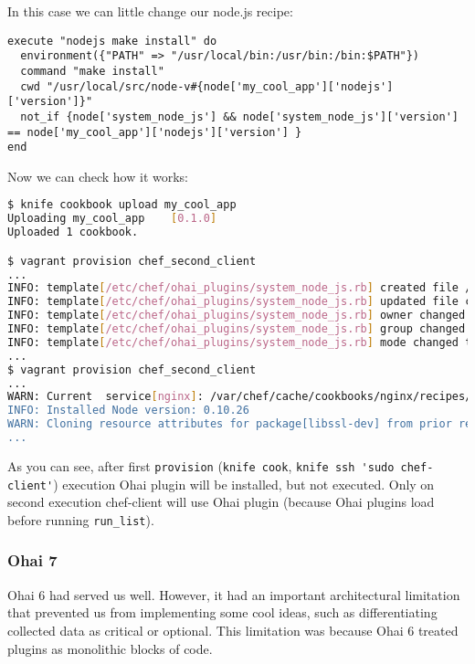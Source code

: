 In this case we can little change our node.js recipe:

\begin{lstlisting}[label=lst:cookbook-ohai7]
execute "nodejs make install" do
  environment({"PATH" => "/usr/local/bin:/usr/bin:/bin:$PATH"})
  command "make install"
  cwd "/usr/local/src/node-v#{node['my_cool_app']['nodejs']['version']}"
  not_if {node['system_node_js'] && node['system_node_js']['version'] == node['my_cool_app']['nodejs']['version'] }
end
\end{lstlisting}

Now we can check how it works:

\begin{lstlisting}[language=Bash,label=lst:cookbook-ohai8]
$ knife cookbook upload my_cool_app
Uploading my_cool_app    [0.1.0]
Uploaded 1 cookbook.

$ vagrant provision chef_second_client
...
INFO: template[/etc/chef/ohai_plugins/system_node_js.rb] created file /etc/chef/ohai_plugins/system_node_js.rb
INFO: template[/etc/chef/ohai_plugins/system_node_js.rb] updated file contents /etc/chef/ohai_plugins/system_node_js.rb
INFO: template[/etc/chef/ohai_plugins/system_node_js.rb] owner changed to 0
INFO: template[/etc/chef/ohai_plugins/system_node_js.rb] group changed to 0
INFO: template[/etc/chef/ohai_plugins/system_node_js.rb] mode changed to 755
...
$ vagrant provision chef_second_client
...
WARN: Current  service[nginx]: /var/chef/cache/cookbooks/nginx/recipes/source.rb:123:in `from_file'
INFO: Installed Node version: 0.10.26
WARN: Cloning resource attributes for package[libssl-dev] from prior resource (CHEF-3694)
...
\end{lstlisting}

As you can see, after first \lstinline!provision! (\lstinline!knife cook!, \lstinline!knife ssh 'sudo chef-client'!) execution Ohai plugin will be installed, but not executed. Only on second execution chef-client will use Ohai plugin (because Ohai plugins load before running \lstinline!run_list!).

\subsubsection{Ohai 7}

Ohai 6 had served us well. However, it had an important architectural limitation that prevented us from implementing some cool ideas, such as differentiating collected data as critical or optional. This limitation was because Ohai 6 treated plugins as monolithic blocks of code.

